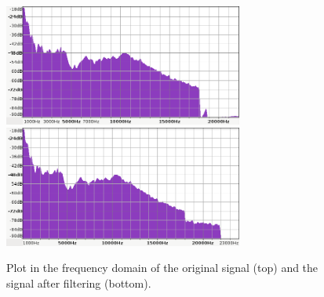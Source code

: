 \begin{figure}
\begin{center}
\includegraphics[width=0.7\textwidth]{images/music-input-spectrum.png}
\includegraphics[width=0.7\textwidth]{images/music-output-spectrum.png}
\caption{Plot in the frequency domain of the original signal (top) and the signal after filtering (bottom).}
\label{fig:spectrum}
\end{center}
\end{figure}
